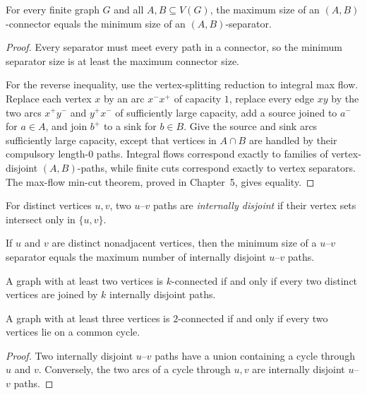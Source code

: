 \begin{notetheorem}
For every finite graph $G$ and all $A,B\subseteq V(G)$, the maximum size of an $(A,B)$-connector equals the minimum size of an $(A,B)$-separator.
\end{notetheorem}
\begin{proof}
Every separator must meet every path in a connector, so the minimum separator size is at least the maximum connector size.

For the reverse inequality, use the vertex-splitting reduction to integral max flow.  Replace each vertex $x$ by an arc $x^-x^+$ of capacity $1$, replace every edge $xy$ by the two arcs $x^+y^-$ and $y^+x^-$ of sufficiently large capacity, add a source joined to $a^-$ for $a\in A$, and join $b^+$ to a sink for $b\in B$.  Give the source and sink arcs sufficiently large capacity, except that vertices in $A\cap B$ are handled by their compulsory length-$0$ paths.  Integral flows correspond exactly to families of vertex-disjoint $(A,B)$-paths, while finite cuts correspond exactly to vertex separators.  The max-flow min-cut theorem, proved in Chapter~5, gives equality.
\end{proof}
\begin{notedefinition}
For distinct vertices $u,v$, two $u$--$v$ paths are \emph{internally disjoint} if their vertex sets intersect only in $\{u,v\}$.
\end{notedefinition}

\begin{notecorollary}
If $u$ and $v$ are distinct nonadjacent vertices, then the minimum size of a $u$--$v$ separator equals the maximum number of internally disjoint $u$--$v$ paths.
\end{notecorollary}

\begin{notecorollary}
A graph with at least two vertices is $k$-connected if and only if every two distinct vertices are joined by $k$ internally disjoint paths.
\end{notecorollary}

\begin{notetheorem}
A graph with at least three vertices is $2$-connected if and only if every two vertices lie on a common cycle.
\end{notetheorem}
\begin{proof}
Two internally disjoint $u$--$v$ paths have a union containing a cycle through $u$ and $v$.  Conversely, the two arcs of a cycle through $u,v$ are internally disjoint $u$--$v$ paths.
\end{proof}

